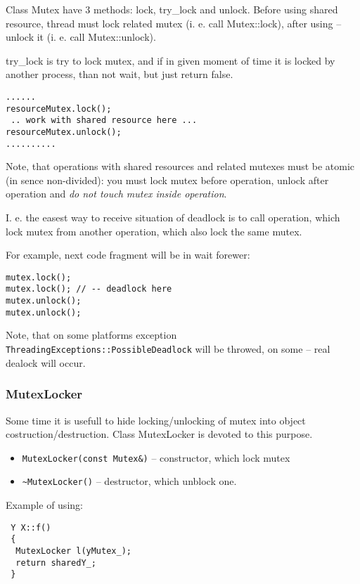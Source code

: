 \documentclass[10pt]{article}
\begin{document}
Class Mutex have 3 methods: lock, try\_lock and unlock. 
Before using shared resource, thread must lock related mutex (i. e.
call Mutex::lock), after using -- unlock it (i. e. call Mutex::unlock).

 try\_lock is try to lock mutex, and if in given moment of time it is locked by
another process, than not wait, but just return false.


\begin{verbatim}
......
resourceMutex.lock();
 .. work with shared resource here ...
resourceMutex.unlock();
.......... 
\end{verbatim}

 Note, that operations with shared resources and related mutexes must
be atomic (in sence non-divided): you must lock mutex before operation,
unlock after operation and {\em do not touch mutex inside operation}.

I. e. the easest way to receive situation of deadlock is to call
 operation, which lock mutex from another operation, which also lock the
same mutex.

 For example, next code fragment will be in wait forewer:
\begin{verbatim}
mutex.lock();
mutex.lock(); // -- deadlock here
mutex.unlock();
mutex.unlock();
\end{verbatim}

Note, that on some platforms exception \verb|ThreadingExceptions::PossibleDeadlock| will be throwed, on some -- real dealock will occur.


\subsubsection{ MutexLocker }

 Some time it is usefull to hide locking/unlocking of mutex into
 object costruction/destruction.
 Class MutexLocker is devoted to this purpose.

\begin{itemize}
 \item \verb|MutexLocker(const Mutex&)| -- constructor, which lock mutex
 \item \verb|~MutexLocker()| -- destructor, which unblock one.
\end{itemize}

 Example of using:
\begin{verbatim}
 Y X::f() 
 {
  MutexLocker l(yMutex_);
  return sharedY_;
 }
\end{verbatim}
\end{document}
